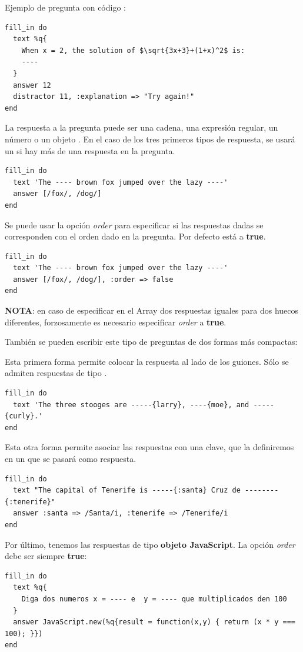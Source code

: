 Ejemplo de pregunta con c\'odigo :
\begin{verbatim}
fill_in do
  text %q{
    When x = 2, the solution of $\sqrt{3x+3}+(1+x)^2$ is:
    ----
  }
  answer 12
  distractor 11, :explanation => "Try again!"
end
\end{verbatim}
\bigskip

La respuesta a la pregunta puede ser una cadena, una expresi\'on regular, un n\'umero o un objeto . En el caso de los tres primeros tipos de respuesta, se usar\'a
un  si hay m\'as de una respuesta en la pregunta.
\begin{verbatim}
fill_in do
  text 'The ---- brown fox jumped over the lazy ----'
  answer [/fox/, /dog/]
end
\end{verbatim}
\bigskip

Se puede usar la opci\'on \textit{order} para especificar si las respuestas dadas se corresponden con el orden dado en la pregunta. Por defecto est\'a a {\bfseries true}.
\begin{verbatim}
fill_in do
  text 'The ---- brown fox jumped over the lazy ----'
  answer [/fox/, /dog/], :order => false
end
\end{verbatim}

{\bfseries NOTA}: en caso de especificar en el Array dos respuestas iguales para dos huecos diferentes, forzosamente es necesario especificar \textit{order} a {\bfseries true}.
\bigskip

Tambi\'en se pueden escribir este tipo de preguntas de dos formas m\'as compactas:

Esta primera forma permite colocar la respuesta al lado de los guiones. S\'olo se admiten respuestas de tipo .
\begin{verbatim}
fill_in do
  text 'The three stooges are -----{larry}, ----{moe}, and -----{curly}.'
end
\end{verbatim}
\bigskip

Esta otra forma permite asociar las respuestas con una clave, que la definiremos en un  que se pasar\'a como respuesta.
\begin{verbatim}
fill_in do
  text "The capital of Tenerife is -----{:santa} Cruz de --------{:tenerife}"
  answer :santa => /Santa/i, :tenerife => /Tenerife/i
end
\end{verbatim}
\bigskip

Por \'ultimo, tenemos las respuestas de tipo {\bfseries objeto JavaScript}. La opci\'on \textit{order} debe ser siempre {\bfseries true}:
\begin{verbatim}
fill_in do
  text %q{
    Diga dos numeros x = ---- e  y = ---- que multiplicados den 100
  }
  answer JavaScript.new(%q{result = function(x,y) { return (x * y === 100); }})
end
\end{verbatim}

